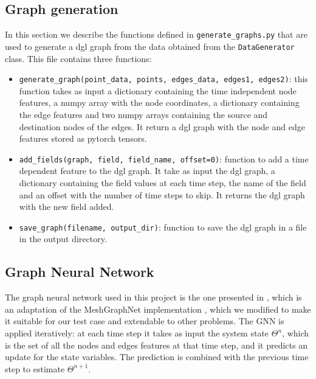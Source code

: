 \documentclass[11pt,a4paper]{article}
\begin{document}
\subsection{Graph generation}
In this section we describe the functions defined in \texttt{generate\_graphs.py} that are used to generate a dgl graph from the data obtained from the \texttt{DataGenerator} class. This file contains three functions: 
\begin{itemize}
    \item \texttt{generate\_graph(point\_data, points, edges\_data, edges1, edges2)}: this function takes as input a dictionary containing the time independent node features, a numpy array with the node coordinates, a dictionary containing the edge features and two numpy arrays containing the source and destination nodes of the edges. It return a dgl graph with the node and edge features stored as pytorch tensors.
    \item \texttt{add\_fields(graph, field, field\_name, offset=0)}: function to add a time dependent feature to the dgl graph. It take as input the dgl graph, a dictionary containing the field values at each time step, the name of the field and an offset with the number of time steps to skip. It returns the dgl graph with the new field added.
    \item \texttt{save\_graph(filename, output\_dir)}: function to save the dgl graph in a file in the output directory.
\end{itemize}

\subsection{Graph Neural Network}


The graph neural network used in this project is the one presented in \cite{Luca}, which is an adaptation of the MeshGraphNet implementation \cite{MeshGraphNet}, which we modified to make it suitable for our test case and extendable to other problems. The GNN is applied iteratively: at each time step it takes as input the system state \(\Theta^{n}\), which is the set of all the nodes and edges features at that time step, and it predicts an update for the state variables. The prediction is combined with the previous time step to estimate \(\Theta^{n+1}\). 
\end{document}
